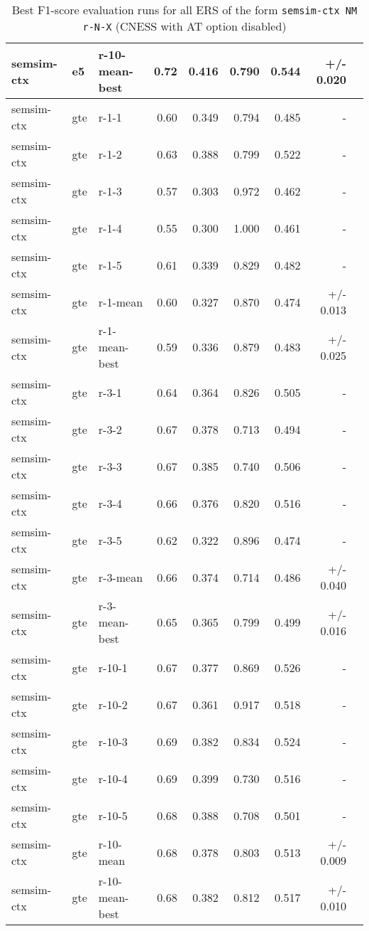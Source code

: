 \begin{table}[H]
\begin{tabular}{lllrrrrrr}
semsim-ctx & e5 & r-10-mean-best & 0.72 & 0.416 & 0.790 & 0.544 & +/- 0.020 \\
\hline
semsim-ctx & gte & r-1-1 & 0.60 & 0.349 & 0.794 & 0.485 & - \\
semsim-ctx & gte & r-1-2 & 0.63 & 0.388 & 0.799 & 0.522 & - \\
semsim-ctx & gte & r-1-3 & 0.57 & 0.303 & 0.972 & 0.462 & - \\
semsim-ctx & gte & r-1-4 & 0.55 & 0.300 & 1.000 & 0.461 & - \\
semsim-ctx & gte & r-1-5 & 0.61 & 0.339 & 0.829 & 0.482 & - \\
semsim-ctx & gte & r-1-mean & 0.60 & 0.327 & 0.870 & 0.474 & +/- 0.013 \\
semsim-ctx & gte & r-1-mean-best & 0.59 & 0.336 & 0.879 & 0.483 & +/- 0.025 \\
\hline
semsim-ctx & gte & r-3-1 & 0.64 & 0.364 & 0.826 & 0.505 & - \\
semsim-ctx & gte & r-3-2 & 0.67 & 0.378 & 0.713 & 0.494 & - \\
semsim-ctx & gte & r-3-3 & 0.67 & 0.385 & 0.740 & 0.506 & - \\
semsim-ctx & gte & r-3-4 & 0.66 & 0.376 & 0.820 & 0.516 & - \\
semsim-ctx & gte & r-3-5 & 0.62 & 0.322 & 0.896 & 0.474 & - \\
semsim-ctx & gte & r-3-mean & 0.66 & 0.374 & 0.714 & 0.486 & +/- 0.040 \\
semsim-ctx & gte & r-3-mean-best & 0.65 & 0.365 & 0.799 & 0.499 & +/- 0.016 \\
\hline
semsim-ctx & gte & r-10-1 & 0.67 & 0.377 & 0.869 & 0.526 & - \\
semsim-ctx & gte & r-10-2 & 0.67 & 0.361 & 0.917 & 0.518 & - \\
semsim-ctx & gte & r-10-3 & 0.69 & 0.382 & 0.834 & 0.524 & - \\
semsim-ctx & gte & r-10-4 & 0.69 & 0.399 & 0.730 & 0.516 & - \\
semsim-ctx & gte & r-10-5 & 0.68 & 0.388 & 0.708 & 0.501 & - \\
semsim-ctx & gte & r-10-mean & 0.68 & 0.378 & 0.803 & 0.513 & +/- 0.009 \\
semsim-ctx & gte & r-10-mean-best & 0.68 & 0.382 & 0.812 & 0.517 & +/- 0.010 \\
\bottomrule
\end{tabular}
\caption{Best F1-score evaluation runs for all ERS of the form \texttt{semsim-ctx NM r-N-X} (CNESS with AT option disabled)}
\label{tab:best-f1-score-mean-best-semsim-ctx}
\end{table}


